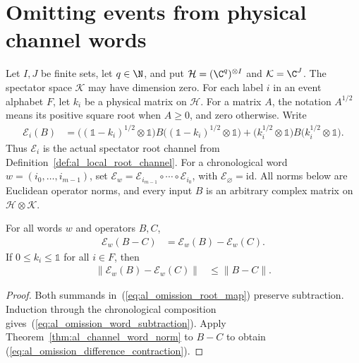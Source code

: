 
\section{Omitting events from physical channel words}
\label{sec:al_channel_word_omission}

Let $I,J$ be finite sets, let $q\in\N$, and put
$\mathcal H=(\C^q)^{\otimes I}$ and $\mathcal K=\C^J$.
The spectator space $\mathcal K$ may have dimension zero.
For each label $i$ in an event alphabet $F$, let $k_i$ be a
physical matrix on $\mathcal H$. For a matrix $A$, the notation
$A^{1/2}$ means its positive square root when $A\ge0$, and zero
otherwise. Write
\begin{align}
    \label{eq:al_omission_root_map}
    \mathcal E_i(B)
     & =\bigl((\mathbb 1-k_i)^{1/2}\otimes\mathbb 1\bigr)
    B\bigl((\mathbb 1-k_i)^{1/2}\otimes\mathbb 1\bigr)
    +\bigl(k_i^{1/2}\otimes\mathbb 1\bigr)
    B\bigl(k_i^{1/2}\otimes\mathbb 1\bigr).
\end{align}
Thus $\mathcal E_i$ is the actual spectator root channel from
Definition~\ref{def:al_local_root_channel}. For a chronological word
$w=(i_0,\ldots,i_{m-1})$, set
$\mathcal E_w=\mathcal E_{i_{m-1}}\circ\cdots\circ\mathcal E_{i_0}$,
with $\mathcal E_{\varnothing}=\mathrm{id}$.
All norms below are Euclidean operator norms, and every input
$B$ is an arbitrary complex matrix on $\mathcal H\otimes\mathcal K$.

\begin{theorem}
    \label{thm:al_channel_word_difference_contraction}
    \leanok
    For all words $w$ and operators $B,C$,
    \begin{align}
        \label{eq:al_omission_word_subtraction}
        \mathcal E_w(B-C) & =\mathcal E_w(B)-\mathcal E_w(C).
    \end{align}
    If $0\le k_i\le\mathbb 1$ for all $i\in F$, then
    \begin{align}
        \label{eq:al_omission_difference_contraction}
        \|\mathcal E_w(B)-\mathcal E_w(C)\| & \le\|B-C\|.
    \end{align}
\end{theorem}
\begin{proof}
    \leanok
    Both summands in~(\ref{eq:al_omission_root_map}) preserve
    subtraction. Induction through the chronological composition
    gives~(\ref{eq:al_omission_word_subtraction}). Apply
    Theorem~\ref{thm:al_channel_word_norm} to $B-C$ to obtain
    (\ref{eq:al_omission_difference_contraction}).
\end{proof}

